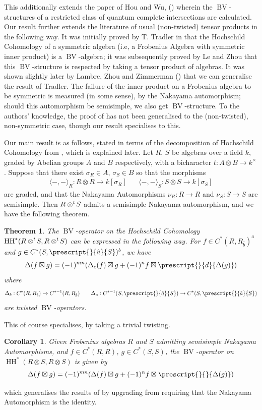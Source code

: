 \documentclass{article}
\newcommand{\HH}{\operatorname{HH}}
\newcommand{\twisten}{\otimes^t\hspace{-1pt}}
\newcommand{\bv}{\operatorname{BV}}
\theoremstyle{plain}
\newtheorem*{theorem*}{Theorem}
\newtheorem*{corollary*}{Corollary}
\theoremstyle{definition}
\begin{document}
This additionally extends the paper of Hou and Wu, (\cite{hou}) wherein the $\bv$-structures of a restricted class of quantum complete intersections are calculated. Our result further extends the literature of usual (non-twisted) tensor products in the following way. It was initially proved by T. Tradler in \cite{Tradler} that the Hochschild Cohomology of a symmetric algebra (i.e, a Frobenius Algebra with symmetric inner product) is a $\bv$-algebra; it was subsequently proved by Le and Zhou \cite{Zhou} that this $\bv$-structure is respected by taking a tensor product of algebras. It was shown slightly later by Lambre, Zhou and Zimmerman (\cite{Lambre}) that we can generalise the result of Tradler. The failure of the inner product on a Frobenius algebra to be symmetric is measured (in some sense), by the Nakayama automorphism; should this automorphism be semisimple,  we also get $\bv$-structure. To the authors' knowledge, the proof of \cite{Zhou} has not been generalised to the (non-twisted), non-symmetric case, though our result specialises to this. 

Our main result is as follows, stated in terms of the decomposition of Hochschild Cohomology from \cite{BriggsWitherspoon}, which is explained later. Let $R$, $S$ be algebras over a field $k$, graded by Abelian groups $A$ and $B$ respectively, with a bicharacter $t:A \otimes B \rightarrow k^\times$. Suppose that there exist $\sigma_R \in A$, $\sigma_S \in B$ so that the morphisms
$$\begin{aligned}{\langle-,-\rangle_R}: R \otimes R \rightarrow k[\sigma_R] \hspace{20pt}{\langle-,-\rangle_S}: S \otimes S \rightarrow k[\sigma_S] \end{aligned}$$
are graded, and that the Nakayama Automorphisms $\nu_R: R \rightarrow R$ and $\nu_S: S \rightarrow S$ are semisimple. Then $R\twisten S$ admits a semisimple Nakayama automorphism, and we have the following theorem.
\begin{theorem*}  The $\bv$-operator on the Hochschild Cohomology $\HH^*(R \twisten S, R \twisten S)$ can be expressed in the following way. For $f\in C^*(R,R_{\hat{b}})^a$ and $g \in C^*(S, \prescript{}{\hat{a}}{S})^b$, we have
$${\Delta}(f\boxtimes g) =  (-1)^{mn}(\Delta_c(f) \boxtimes g +(-1)^{n} f \boxtimes \prescript{}{d}{\Delta(g)})$$
where $$\Delta_b: C^*(R,R_{\hat{b}}) \rightarrow C^{*-1}(R,R_{\hat{b}})  \hspace{20pt}\Delta_a: C^{*-1}(S, \prescript{}{\hat{a}}{S})\rightarrow C^*(S, \prescript{}{\hat{a}}{S}) $$ are twisted $\bv$-operators.
\end{theorem*}
This of course specialises, by taking a trivial twisting.
\begin{corollary*} Given Frobenius algebras $R$ and $S$ admitting semisimple Nakayama Automorphisms, and $f \in C^*(R, R)$, $g \in C^*(S,S)$, the $\bv$-operator on $\HH^*(R\otimes S, R\otimes S)$ is given by
$${\Delta}(f\boxtimes g) =  (-1)^{mn}(\Delta(f) \boxtimes g +(-1)^{n} f\boxtimes \prescript{}{}{\Delta(g)})$$
\end{corollary*}
which generalises the results of \cite{Zhou} by upgrading from requiring that the Nakayama Automorphism is the identity.
\end{document}
